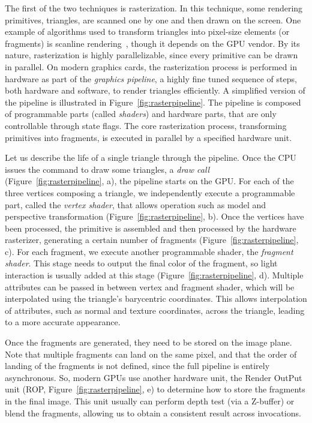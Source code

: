 The first of the two techniques is rasterization. In this technique, some rendering primitives, triangles, are scanned one by one and then drawn on the screen. One example of algorithms used to transform triangles into pixel-size elements (or fragments) is scanline rendering~\cite{Wylie1967}, though it depends on the GPU vendor. By its nature, rasterization is highly parallelizable, since every primitive can be drawn in parallel. On modern graphics cards, the rasterization process is performed in hardware as part of the \emph{graphics pipeline}, a highly fine tuned sequence of steps, both hardware and software, to render triangles efficiently. A simplified version of the pipeline is illustrated in Figure~\ref{fig:rasterpipeline}. The pipeline is composed of programmable parts (called \emph{shaders}) and hardware parts, that are only controllable through state flags. The core rasterization process, transforming primitives into fragments, is executed in parallel by a specified hardware unit. 

Let us describe the life of a single triangle through the pipeline. Once the CPU issues the command to draw some triangles, a \emph{draw call} (Figure~\ref{fig:rasterpipeline}, a), the pipeline starts on the GPU. For each of the three vertices composing a triangle, we independently execute a programmable part, called the \emph{vertex shader}, that allows operation such as model and perspective transformation (Figure~\ref{fig:rasterpipeline}, b). Once the vertices have been processed, the primitive is assembled and then processed by the hardware rasterizer, generating a certain number of fragments  (Figure~\ref{fig:rasterpipeline}, c). For each fragment, we execute another programmable shader, the \emph{fragment shader}. This stage needs to output the final color of the fragment, so light interaction is usually added at this stage (Figure~\ref{fig:rasterpipeline}, d). Multiple attributes can be passed in between vertex and fragment shader, which will be interpolated using the triangle's barycentric coordinates. This allows interpolation of attributes, such as normal and texture coordinates, across the triangle, leading to a more accurate appearance. 

Once the fragments are generated, they need to be stored on the image plane. Note that multiple fragments can land on the same pixel, and that the order of landing of the fragments is not defined, since the full pipeline is entirely asynchronous. So, modern GPUs use another hardware unit, the Render OutPut unit (ROP, Figure~\ref{fig:rasterpipeline}, e) to determine how to store the fragments in the final image. This unit usually can perform depth test (via a Z-buffer) or blend the fragments, allowing us to obtain a consistent result across invocations.

